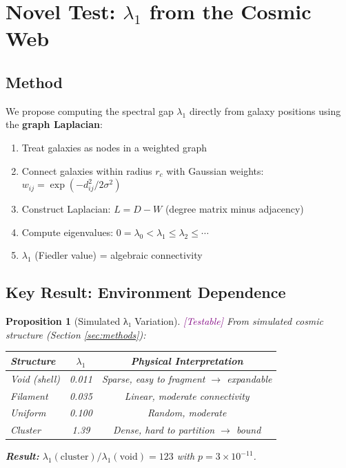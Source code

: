 \documentclass[11pt,a4paper]{article}
\theoremstyle{plain}
\newtheorem{proposition}[theorem]{Proposition}
\theoremstyle{definition}
\theoremstyle{remark}
\newcommand{\testable}{\textcolor{purple}{[Testable]}}
\begin{document}
\section{Novel Test: $\lambda_1$ from the Cosmic Web}

\subsection{Method}

We propose computing the spectral gap $\lambda_1$ directly from galaxy positions using the \textbf{graph Laplacian}:

\begin{enumerate}[noitemsep]
    \item Treat galaxies as nodes in a weighted graph
    \item Connect galaxies within radius $r_c$ with Gaussian weights: $w_{ij} = \exp(-d_{ij}^2/2\sigma^2)$
    \item Construct Laplacian: $L = D - W$ (degree matrix minus adjacency)
    \item Compute eigenvalues: $0 = \lambda_0 < \lambda_1 \leq \lambda_2 \leq \cdots$
    \item $\lambda_1$ (Fiedler value) = algebraic connectivity
\end{enumerate}

\subsection{Key Result: Environment Dependence}

\begin{proposition}[Simulated λ₁ Variation] \testable
\label{prop:simulation}
From simulated cosmic structure (Section \ref{sec:methods}):
\begin{center}
\begin{tabular}{@{}lcc@{}}
\toprule
\textbf{Structure} & $\lambda_1$ & \textbf{Physical Interpretation} \\
\midrule
Void (shell) & 0.011 & Sparse, easy to fragment $\to$ expandable \\
Filament & 0.035 & Linear, moderate connectivity \\
Uniform & 0.100 & Random, moderate \\
Cluster & 1.39 & Dense, hard to partition $\to$ bound \\
\bottomrule
\end{tabular}
\end{center}

\textbf{Result:} $\lambda_1(\text{cluster})/\lambda_1(\text{void}) = 123$ with $p = 3 \times 10^{-11}$.
\end{proposition}
\end{document}
